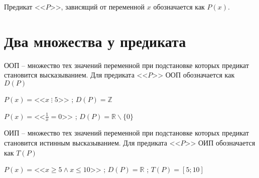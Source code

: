 \begin{remark}
    Предикат <<$P$>>, зависящий от переменной $x$ обозначается как $P(x)$.
\end{remark}

\section{Два множества у предиката}

\begin{definition}
    ООП -- множество тех значений переменной при подстановке которых предикат становится высказыванием. Для предиката <<$P$>> ООП обозначается как $D(P)$
\end{definition}

\begin{example}
    $P(x) = \text{<<} x \; \vdots \; 5 \text{>>}$ ; $D(P) = \mathbb{Z}$
\end{example}

\begin{example}
    $P(x) = \text{<<} \frac{1}{x} = 0 \text{>>}$ ; $D(P) = \mathbb{R} \backslash \{0\}$
\end{example}

\begin{definition}
    ОИП -- множество тех значений переменной при подстановке которых предикат становится истинным высказыванием. Для предиката <<$P$>> ОИП обозначается как $T(P)$
\end{definition}

\begin{example}
    $P(x) = \text{<<} x \ge 5 \land x \le 10 \text{>>}$ ; $D(P) = \mathbb{R}$ ; $T(P) = \left[ 5; 10 \right]$
\end{example}
